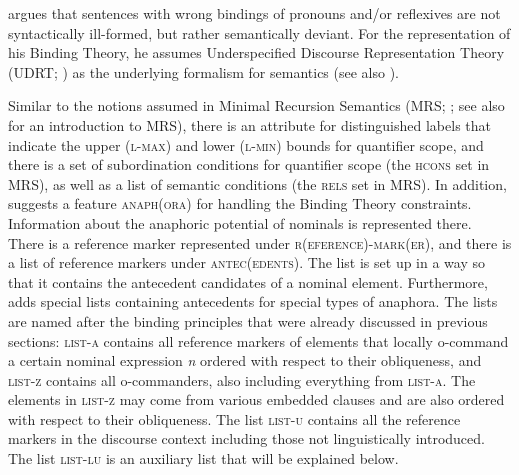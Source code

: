 \documentclass[output=paper,biblatex,babelshorthands,newtxmath,draftmode,colorlinks,citecolor=brown]{langscibook}
\begin{document}
\citet{Branco2002a} argues that sentences with wrong bindings of pronouns and/or reflexives are not
syntactically ill-formed, but rather semantically deviant. For the representation of his Binding Theory, he
assumes Underspecified Discourse Representation Theory (UDRT; \citealp{Reyle93b-u,FR95a-u}) as the
underlying formalism for semantics (see also
). 

Similar to the notions assumed in Minimal Recursion Semantics (MRS; \citealp*{CFPS2005a}; see also  for an introduction to MRS), there is an
attribute for distinguished labels that indicate the upper (\textsc{l-max}) and lower
(\textsc{l-min}) bounds for quantifier scope, and there is a set of subordination conditions for
quantifier scope (the \textsc{hcons} set in MRS), as well as a list of semantic conditions (the \textsc{rels}
set in MRS). In addition, \citeauthor{Branco2002a} suggests a feature \textsc{anaph(ora)} for handling
the Binding Theory constraints. Information about the anaphoric potential of nominals is represented
there. There is a reference marker represented under \textsc{r(eference)-mark(er)}, and there is a list
of reference markers under \textsc{antec(edents)}. The list is set up in a way so that it contains
the antecedent candidates of a nominal element. Furthermore, \citeauthor{Branco2002a} adds special
lists containing antecedents for special types of anaphora. The lists are named after the binding
principles that were already discussed in previous sections: \textsc{list-a} contains all reference
markers of elements that locally o-command a certain nominal expression \emph{n} ordered with
respect to their obliqueness, and \textsc{list-z} contains all o-commanders, also including everything
from \textsc{list-a}. The elements in \textsc{list-z} may come from various
embedded clauses and are also ordered with respect to their obliqueness. The list \textsc{list-u}
contains all the reference markers in the discourse context including those not linguistically
introduced. The list \textsc{list-lu} is an auxiliary list that will be explained below.
\ea
{}
\z
\end{document}
